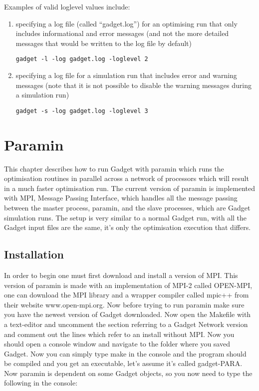 \documentclass[]{book}
\begin{document}
Examples of valid loglevel values include:

\begin{enumerate}
\def\labelenumi{\arabic{enumi}.}
\item
  specifying a log file (called ``gadget.log'') for an optimising run
  that only includes informational and error messages (and not the
  more detailed messages that would be written to the log file by
  default)

\begin{verbatim}
gadget -l -log gadget.log -loglevel 2
\end{verbatim}
\item
  specifying a log file for a simulation run that includes error and
  warning messages (note that it is not possible to disable the
  warning messages during a simulation run)

\begin{verbatim}
gadget -s -log gadget.log -loglevel 3
\end{verbatim}
\end{enumerate}

\hypertarget{chap:paramin}{%
\chapter{Paramin}\label{chap:paramin}}

This chapter describes how to run Gadget with paramin which runs the
optimisation routines in parallel across a network of processors which
will result in a much faster optimisation run. The current version of
paramin is implemented with MPI, Message Passing Interface, which
handles all the message passing between the master process, paramin, and
the slave processes, which are Gadget simulation runs. The setup is very
similar to a normal Gadget run, with all the Gadget input files are the
same, it's only the optimisation execution that differs.

\hypertarget{sec:paramininstall}{%
\section{Installation}\label{sec:paramininstall}}

In order to begin one must first download and install a version of MPI.
This version of paramin is made with an implementation of MPI-2 called
OPEN-MPI, one can download the MPI library and a wrapper compiler called
mpic++ from their website www.open-mpi.org. Now before trying to run
paramin make sure you have the newest version of Gadget downloaded. Now
open the Makefile with a text-editor and uncomment the section referring
to a Gadget Network version and comment out the lines which refer to an
install without MPI. Now you should open a console window and navigate
to the folder where you saved Gadget. Now you can simply type make in
the console and the program should be compiled and you get an
executable, let's assume it's called gadget-PARA. Now paramin is
dependent on some Gadget objects, so you now need to type the following
in the console:
\end{document}
